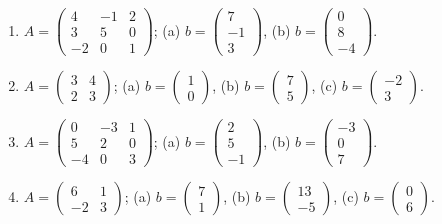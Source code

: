\begin{enumerate}[label=\arabic*., leftmargin=*]
\item $A=\begin{pmatrix}4&-1&2\\3&5&0\\-2&0&1\end{pmatrix}$; \quad
(a) $b=\begin{pmatrix}7\\-1\\3\end{pmatrix}$, \quad
(b) $b=\begin{pmatrix}0\\8\\-4\end{pmatrix}$.

\item $A=\begin{pmatrix}3&4\\2&3\end{pmatrix}$; \quad
(a) $b=\begin{pmatrix}1\\0\end{pmatrix}$, \quad
(b) $b=\begin{pmatrix}7\\5\end{pmatrix}$, \quad
(c) $b=\begin{pmatrix}-2\\3\end{pmatrix}$.

\item $A=\begin{pmatrix}0&-3&1\\5&2&0\\-4&0&3\end{pmatrix}$; \quad
(a) $b=\begin{pmatrix}2\\5\\-1\end{pmatrix}$, \quad
(b) $b=\begin{pmatrix}-3\\0\\7\end{pmatrix}$.

\item $A=\begin{pmatrix}6&1\\-2&3\end{pmatrix}$; \quad
(a) $b=\begin{pmatrix}7\\1\end{pmatrix}$, \quad
(b) $b=\begin{pmatrix}13\\-5\end{pmatrix}$, \quad
(c) $b=\begin{pmatrix}0\\6\end{pmatrix}$.


\end{enumerate}
